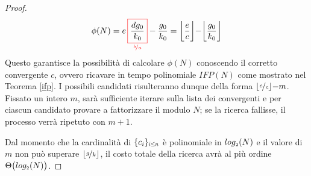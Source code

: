 \documentclass[twoside,symmetric,justified,openany,nobib]{tufte-book}
\def\P#1{_{\text{\tiny $#1$}}}
\begin{document}
\begin{proof}
{\begin{minipage}[b]{0.49\textwidth}
        \end{minipage}
      }
  \begin{equation*}
    \phi(N)=e\,{\color{red} \underset{\nicefrac{b}{a}}{\boxed{\color{black}\frac{dg_0}{k_0}}} }-\frac{g_0}{k_0}=\biggl\lfloor \frac{e}{c}\biggr\rfloor {-} \biggl\lfloor \frac{g_0}{k_0} \biggr\rfloor
  \end{equation*}
  Questo garantisce la possibilità di calcolare $\phi(N)$ conoscendo il corretto convergente $c$, ovvero ricavare in tempo polinomiale $IFP(N)$ come mostrato nel Teorema \ref{ifp}.
  I possibili candidati risulteranno dunque della forma $\lfloor\nicefrac{e}{c}\rfloor{-}m$. Fissato un intero $m$, sarà sufficiente iterare sulla lista dei convergenti e per ciascun candidato provare a fattorizzare il modulo $N$; se la ricerca fallisse, il processo verrà ripetuto con $m{+}1$.

  Dal momento che la cardinalità di $\{ c_i \}_{\scalebox{.7}{$i{\leq}n$}}$ è polinomiale in $log\P{2}(N)$ e il valore di $m$ non può superare $\lfloor\nicefrac{g}{k}\rfloor$, il costo totale della ricerca avrà al più ordine $\Theta\bigl(log\P{2}(N)\bigr)$.
\end{proof}

\noindent
\end{document}
